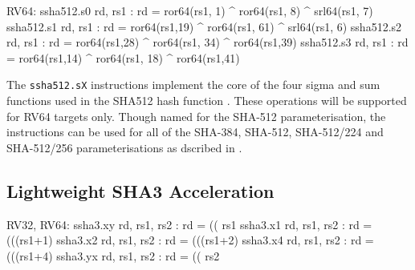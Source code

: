 \begin{isa}
RV64:
    ssha512.s0 rd, rs1 : rd = ror64(rs1, 1) ^ ror64(rs1,  8) ^ srl64(rs1, 7)
    ssha512.s1 rd, rs1 : rd = ror64(rs1,19) ^ ror64(rs1, 61) ^ srl64(rs1, 6)
    ssha512.s2 rd, rs1 : rd = ror64(rs1,28) ^ ror64(rs1, 34) ^ ror64(rs1,39)
    ssha512.s3 rd, rs1 : rd = ror64(rs1,14) ^ ror64(rs1, 18) ^ ror64(rs1,41)
\end{isa}

The {\tt ssha512.sX}
instructions implement the core of the four sigma and sum functions used in
the SHA512 hash function \cite[Section 4.1.3]{nist:fips:180:4}.
These operations will be supported for RV64 targets only.
Though named for the SHA-512 parameterisation, the instructions
can be used for all of the SHA-384, SHA-512, SHA-512/224 and SHA-512/256
parameterisations as dscribed in \cite{nist:fips:180:4}.




\subsection{Lightweight SHA3 Acceleration}

\begin{isa}
RV32, RV64:
    ssha3.xy rd, rs1, rs2 : rd = (( rs1    %
    ssha3.x1 rd, rs1, rs2 : rd = (((rs1+1) %
    ssha3.x2 rd, rs1, rs2 : rd = (((rs1+2) %
    ssha3.x4 rd, rs1, rs2 : rd = (((rs1+4) %
    ssha3.yx rd, rs1, rs2 : rd = (( rs2    %
\end{isa}

